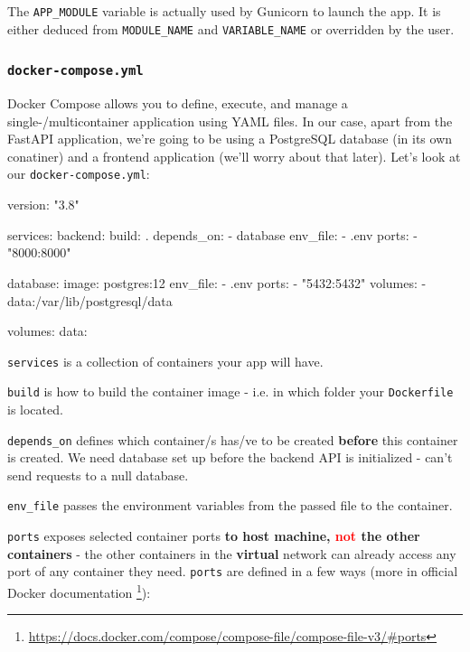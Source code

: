 \documentclass{article}
\newcommand{\flink}[1]{\footnote{\href{#1}{#1}}}
\newcommand{\dockerinline}[1]{\lstinline[language=docker, style=cstyle, basicstyle=\ttfamily\normalsize]{#1}}
\begin{document}
The \texttt{APP\_MODULE} variable is actually used by Gunicorn to launch the app. It is either deduced from \texttt{MODULE\_NAME} and \texttt{VARIABLE\_NAME} or overridden by the user.

\subsubsection{\texttt{docker-compose.yml}\label{preparations:dockercompose}}

Docker Compose allows you to define, execute, and manage a single-/multicontainer application using YAML files. In our case, apart from the FastAPI application, we're going to be using a PostgreSQL database (in its own conatiner) and a frontend application (we'll worry about that later). Let's look at our \texttt{docker-compose.yml}:

\begin{dockercode}
version: "3.8"

services:
    backend:
        build: .
        depends_on:
            - database
        env_file:
            - .env
        ports:
            - "8000:8000"

    database:
        image: postgres:12
        env_file:
            - .env
        ports:
            - "5432:5432"
        volumes:
            - data:/var/lib/postgresql/data

volumes:
    data:
\end{dockercode}

\dockerinline{services} is a collection of containers your app will have.

\dockerinline{build} is how to build the container image - i.e. in which folder your \texttt{Dockerfile} is located.

\dockerinline{depends_on} defines which container/s has/ve to be created \textbf{before} this container is created. We need database set up before the backend API is initialized - can't send requests to a null database.

\dockerinline{env_file} passes the environment variables from the passed file to the container.

\dockerinline{ports} exposes selected container ports \textbf{to host machine, \textcolor{red}{not} the other containers} - the other containers in the \textbf{virtual} network can already access any port of any container they need. \dockerinline{ports} are defined in a few ways (more in official Docker documentation \flink{https://docs.docker.com/compose/compose-file/compose-file-v3/\#ports}):
\end{document}
